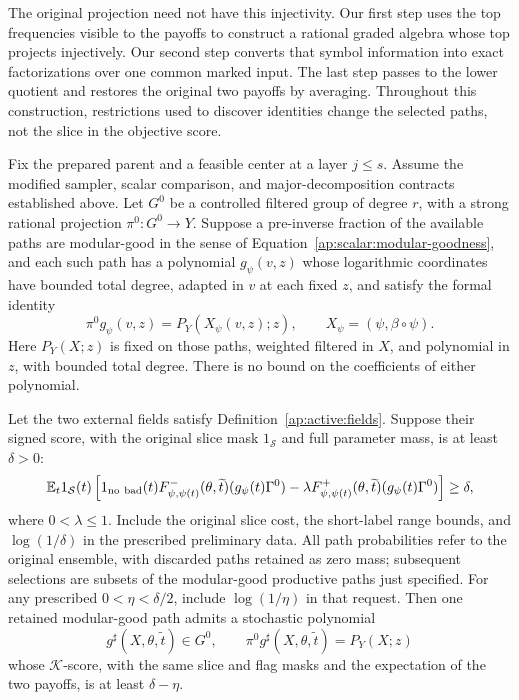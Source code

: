 The original projection need not have this injectivity.  Our first
step uses the top frequencies visible to the payoffs to construct a
rational graded algebra whose top projects injectively.  Our second
step converts that symbol information into exact factorizations over
one common marked input.  The last step passes to the lower quotient
and restores the original two payoffs by averaging.  Throughout this
construction, restrictions used to discover identities change the
selected paths, not the slice in the objective score.

\begin{theorem}\label{ap:active:replacement}
Fix the prepared parent and a feasible center at a layer $j\leq s$.
Assume the modified sampler, scalar comparison, and major-decomposition
contracts established above.  Let $G^0$ be a controlled filtered
group of degree $r$, with a strong rational projection
$\pi^0:G^0\to Y$.  Suppose a pre-inverse fraction of the available
paths are modular-good in the sense of
Equation~\eqref{ap:scalar:modular-goodness}, and each such path has a
polynomial $g_\psi(v,z)$ whose logarithmic coordinates
have bounded total degree, adapted in $v$ at each fixed $z$, and
satisfy the formal identity
\begin{equation}
 \pi^0g_\psi(v,z)=P_Y(X_\psi(v,z);z),
 \qquad X_\psi=(\psi,\beta\circ\psi).
 \label{ap:active:initial-marking}
\end{equation}
Here $P_Y(X;z)$ is fixed on those paths, weighted filtered in $X$,
and polynomial in $z$, with bounded total degree.  There is no bound
on the coefficients of either polynomial.

Let the two external fields satisfy
Definition~\ref{ap:active:fields}.  Suppose their signed score, with
the original slice mask $1_{\mathcal S}$ and full parameter mass, is
at least $\delta>0$:
\begin{equation}
 \mathbb E_t 1_{\mathcal S}(t)
 \left[
  1_{\mathrm{no\ bad}}(t)
  F^-_{\psi,\psi(t)}(\theta,\widetilde t)
       (g_\psi(t)\Gamma^0)
  -\lambda F^+_{\psi,\psi(t)}(\theta,\widetilde t)
       (g_\psi(t)\Gamma^0)
 \right]\geq\delta,
 \label{ap:active:input-score}
\end{equation}
where $0<\lambda\leq1$.  Include the original slice cost, the short-label
range bounds, and $\log(1/\delta)$ in the prescribed preliminary data.
All path probabilities refer to the original ensemble, with discarded
paths retained as zero mass; subsequent selections are subsets of the
modular-good productive paths just specified.  For any prescribed
$0<\eta<\delta/2$, include $\log(1/\eta)$ in that request.  Then one
retained modular-good path admits a stochastic polynomial
\begin{equation}
 g^\sharp(X,\theta,\widetilde t)\in G^0,
 \qquad \pi^0g^\sharp(X,\theta,\widetilde t)=P_Y(X;z)
 \label{ap:active:output-marking}
\end{equation}
whose $\mathcal K$-score, with the same slice and flag masks and the
expectation of the two payoffs, is at least $\delta-\eta$.


\end{theorem}
